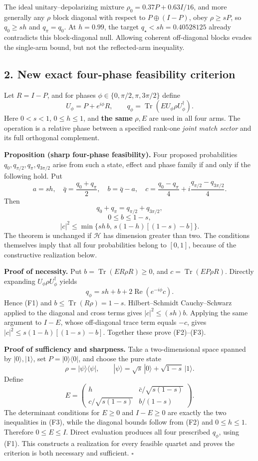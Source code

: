 \documentclass[
  10pt,
  a4paper,
]{article}
\begin{document}
The ideal unitary--depolarizing mixture \(\rho_0=0.37P+0.63I/16\), and more generally any \(\rho\) block diagonal with respect to \(P\oplus(I-P)\), obey \(\rho\ge sP\), so \(q_0\ge sh\) and \(q_\pi=q_0\). At \(h=0.99\), the target \(q_\star<sh=0.40528125\) already contradicts this block-diagonal null. Allowing coherent off-diagonal blocks evades the single-arm bound, but not the reflected-arm inequality.

\subsection{2. New exact four-phase feasibility criterion}\label{new-exact-four-phase-feasibility-criterion}

Let \(R=I-P\), and for phases \(\phi\in\{0,\pi/2,\pi,3\pi/2\}\) define \[
U_\phi=P+e^{i\phi}R,\qquad
q_\phi=\operatorname{Tr}(EU_\phi\rho U_\phi^\dagger).
\] Here \(0<s<1\), \(0\le h\le1\), and \textbf{the same} \(\rho,E\) are used in all four arms. The operation is a relative phase between a specified rank-one \emph{joint match sector} and its full orthogonal complement.

\textbf{Proposition (sharp four-phase feasibility).} Four proposed probabilities \(q_0,q_{\pi/2},q_\pi,q_{3\pi/2}\) arise from such a state, effect and phase family if and only if the following hold. Put \[
a=sh,\quad
\bar q=\frac{q_0+q_\pi}{2},\quad
b=\bar q-a,\quad
c=\frac{q_0-q_\pi}{4}+i\frac{q_{\pi/2}-q_{3\pi/2}}{4}.
\] Then \[
\boxed{q_0+q_\pi=q_{\pi/2}+q_{3\pi/2},}\tag{F1}
\] \[
\boxed{0\le b\le1-s,}\tag{F2}
\] \[
\boxed{|c|^2\le\min\bigl\{sh\,b,\,s(1-h)[(1-s)-b]\bigr\}.}\tag{F3}
\] The theorem is unchanged if \(\mathcal H\) has dimension greater than two. The conditions themselves imply that all four probabilities belong to \([0,1]\), because of the constructive realization below.

\textbf{Proof of necessity.} Put \(b=\operatorname{Tr}(ER\rho R)\ge0\), and \(c=\operatorname{Tr}(EP\rho R)\). Directly expanding \(U_\phi\rho U_\phi^\dagger\) yields \[
q_\phi=sh+b+2\operatorname{Re}(e^{-i\phi}c).
\] Hence (F1) and \(b\le\operatorname{Tr}(R\rho)=1-s\). Hilbert--Schmidt Cauchy--Schwarz applied to the diagonal and cross terms gives \(|c|^2\le (sh)b\). Applying the same argument to \(I-E\), whose off-diagonal trace term equals \(-c\), gives \(|c|^2\le s(1-h)[(1-s)-b]\). Together these prove (F2)--(F3).

\textbf{Proof of sufficiency and sharpness.} Take a two-dimensional space spanned by \(|0\rangle,|1\rangle\), set \(P=|0\rangle\langle0|\), and choose the pure state \[
\rho=|\psi\rangle\langle\psi|,\qquad
|\psi\rangle=\sqrt s\,|0\rangle+\sqrt{1-s}\,|1\rangle.
\] Define \[
E=\begin{pmatrix}
 h&\bar c/\sqrt{s(1-s)}\\
 c/\sqrt{s(1-s)}& b/(1-s)
\end{pmatrix}.
\] The determinant conditions for \(E\ge0\) and \(I-E\ge0\) are exactly the two inequalities in (F3), while the diagonal bounds follow from (F2) and \(0\le h\le1\). Therefore \(0\le E\le I\). Direct evaluation produces all four prescribed \(q_\phi\), using (F1). This constructs a realization for every feasible quartet and proves the criterion is both necessary and sufficient. \(\square\)
\end{document}
